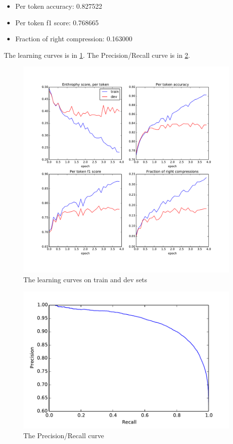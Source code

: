 \documentclass[a4paper,12pt,oneside]{article}
\begin{document}
\begin{itemize}
  \item Per token accuracy: 0.827522
  \item Per token f1 score: 0.768665
  \item Fraction of right compression: 0.163000
\end{itemize}

The learning curves is in \cref{fig:lcur}. The Precision/Recall curve is in \cref{fig:pr}.

\begin{figure}[t]%
	\centering
	\includegraphics[width=\columnwidth]{learning_curves}
	\caption{The learning curves on train and dev sets}%
	\label{fig:lcur}%
\end{figure}


\begin{figure}[t]%
	\centering
	\includegraphics[width=\columnwidth]{precision_recal_curve}
	\caption{The Precision/Recall curve}%
	\label{fig:pr}%
\end{figure}
\end{document}
